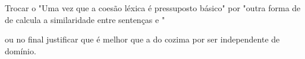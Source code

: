 












Trocar o "Uma vez que a coesão léxica é pressuposto básico" por "outra forma de de calcula a similaridade entre sentenças e "

ou no final justificar que é melhor que a do cozima por ser independente de domínio.














